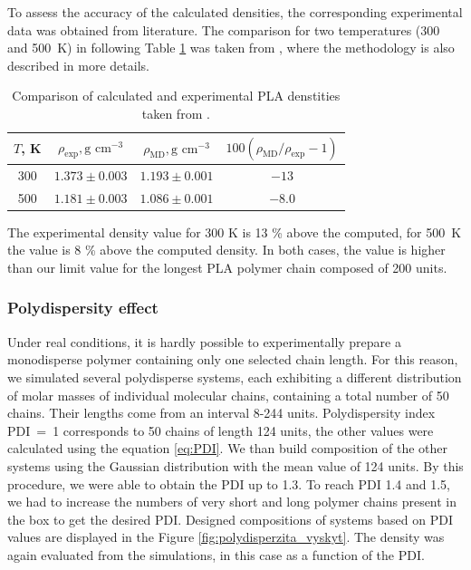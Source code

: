 To assess the accuracy of the calculated densities, the corresponding experimental data was obtained from literature. The comparison for two temperatures (300 and 500~K) in following Table \ref{tab:PLA_dens} was taken from \cite{klajmon_glass_2023}, where the methodology is also described in more details.

\begin{table}[htbp]
	\centering
	\caption{Comparison of calculated and experimental PLA denstities taken from \cite{klajmon_glass_2023}.}
	\begin{tabular}{cccc}
		\toprule
		$T$, K & $\rho_{\text{exp}},  \text{g cm}^{-3}$ & $\rho_{\text{MD}}, \text{g cm}^{-3}$ & $100(\rho_{\text{MD}}/\rho_{\text{exp}}-1)$\\
		\midrule
		 300   & $1.373 \pm 0.003$ & $1.193 \pm 0.001$ & $-13$\\
		 500   & $1.181 \pm 0.003$ & $1.086 \pm 0.001$ & $-8.0$ \\
		\bottomrule
	\end{tabular}%
	\label{tab:PLA_dens}%
\end{table}%

The experimental density value for 300 K is 13 \% above the computed, for 500~K the value is 8 \% above the computed density. In both cases, the value is higher than our limit value for the longest PLA polymer chain composed of 200 units.
 
\subsubsection{Polydispersity effect}
Under real conditions, it is hardly possible to experimentally prepare a monodisperse polymer containing only one selected chain length. For this reason, we simulated several polydisperse systems, each exhibiting a different distribution of molar masses of individual molecular chains, containing a total number of 50 chains. Their lengths come from an interval 8-244 units. Polydispersity index PDI~=~1 corresponds to 50 chains of length 124 units, the other values were calculated using the equation \ref{eq:PDI}. We than build composition of the other systems using the Gaussian distribution with the mean value of 124 units. By this procedure, we were able to obtain the PDI up to 1.3. To reach PDI 1.4 and 1.5, we had to increase the numbers of very short and long polymer chains present in the box to get the desired PDI. Designed compositions of systems based on PDI values are displayed in the Figure \ref{fig:polydisperzita_vyskyt}. The density was again evaluated from the simulations, in this case as a function of the PDI.

